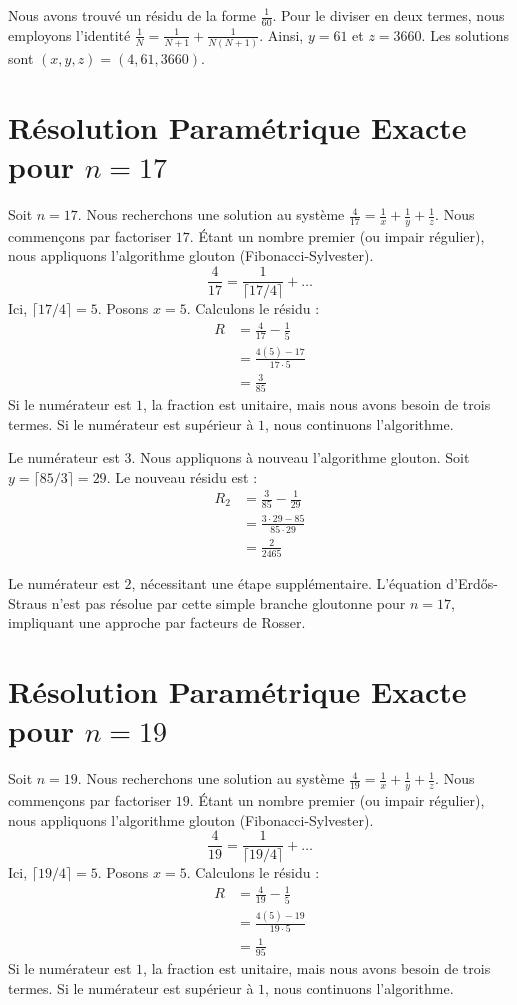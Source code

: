 \documentclass[11pt,a4paper]{article}
\begin{document}
Nous avons trouvé un résidu de la forme $\frac{1}{60}$. Pour le diviser en deux termes, nous employons l'identité $\frac{1}{N} = \frac{1}{N+1} + \frac{1}{N(N+1)}$.
Ainsi, $y = 61$ et $z = 3660$.
Les solutions sont $(x, y, z) = (4, 61, 3660)$.

\section{Résolution Paramétrique Exacte pour $n = 17$}
Soit $n = 17$. Nous recherchons une solution au système $\frac{4}{17} = \frac{1}{x} + \frac{1}{y} + \frac{1}{z}$.
Nous commençons par factoriser $17$. Étant un nombre premier (ou impair régulier), nous appliquons l'algorithme glouton (Fibonacci-Sylvester).
\begin{equation}
\frac{4}{17} = \frac{1}{\lceil 17/4 \rceil} + \ldots
\end{equation}
Ici, $\lceil 17/4 \rceil = 5$. Posons $x = 5$.
Calculons le résidu :
\begin{align*}
R &= \frac{4}{17} - \frac{1}{5} \\
&= \frac{4(5) - 17}{17 \cdot 5} \\
&= \frac{3}{85}
\end{align*}
Si le numérateur est $1$, la fraction est unitaire, mais nous avons besoin de trois termes. Si le numérateur est supérieur à $1$, nous continuons l'algorithme.

Le numérateur est $3$. Nous appliquons à nouveau l'algorithme glouton.
Soit $y = \lceil 85/3 \rceil = 29$.
Le nouveau résidu est :
\begin{align*}
R_2 &= \frac{3}{85} - \frac{1}{29} \\
&= \frac{3 \cdot 29 - 85}{85 \cdot 29} \\
&= \frac{2}{2465}
\end{align*}

Le numérateur est $2$, nécessitant une étape supplémentaire. L'équation d'Erd\H{o}s-Straus n'est pas résolue par cette simple branche gloutonne pour $n=17$, impliquant une approche par facteurs de Rosser.

\section{Résolution Paramétrique Exacte pour $n = 19$}
Soit $n = 19$. Nous recherchons une solution au système $\frac{4}{19} = \frac{1}{x} + \frac{1}{y} + \frac{1}{z}$.
Nous commençons par factoriser $19$. Étant un nombre premier (ou impair régulier), nous appliquons l'algorithme glouton (Fibonacci-Sylvester).
\begin{equation}
\frac{4}{19} = \frac{1}{\lceil 19/4 \rceil} + \ldots
\end{equation}
Ici, $\lceil 19/4 \rceil = 5$. Posons $x = 5$.
Calculons le résidu :
\begin{align*}
R &= \frac{4}{19} - \frac{1}{5} \\
&= \frac{4(5) - 19}{19 \cdot 5} \\
&= \frac{1}{95}
\end{align*}
Si le numérateur est $1$, la fraction est unitaire, mais nous avons besoin de trois termes. Si le numérateur est supérieur à $1$, nous continuons l'algorithme.
\end{document}
